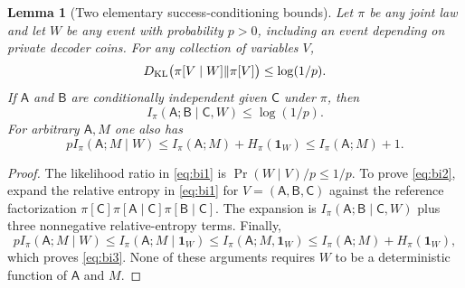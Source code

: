 \documentclass[11pt,letterpaper]{article}
\newtheorem{lemma}[theorem]{Lemma}
\numberwithin{equation}{section}
\begin{document}
\begin{lemma}[Two elementary success-conditioning bounds]
\label{lem:success-conditioning}
Let $\pi$ be any joint law and let $W$ be any event with probability $p>0$, including an event depending on private decoder coins.
For any collection of variables $V$,
\begin{equation}
D_{\rm KL}\bigl(\pi[V\mid W]\Vert\pi[V]\bigr)\le\log(1/p).
 \label{eq:bi1}
\end{equation}
If $\mathsf{A}$ and $\mathsf{B}$ are conditionally independent given $\mathsf{C}$ under $\pi$, then
\begin{equation}
I_\pi(\mathsf{A};\mathsf{B}\mid \mathsf{C},W)\le\log(1/p).
 \label{eq:bi2}
\end{equation}
For arbitrary $\mathsf{A},M$ one also has
\begin{equation}
p I_\pi(\mathsf{A};M\mid W)\le I_\pi(\mathsf{A};M)+H_\pi(\mathbf{1}_W)
 \le I_\pi(\mathsf{A};M)+1.
 \label{eq:bi3}
\end{equation}
\end{lemma}
\begin{proof}
The likelihood ratio in \eqref{eq:bi1} is $\Pr(W\mid V)/p\le1/p$.
To prove \eqref{eq:bi2}, expand the relative entropy in \eqref{eq:bi1} for $V=(\mathsf{A},\mathsf{B},\mathsf{C})$ against the reference factorization $\pi[\mathsf{C}]\pi[\mathsf{A}\mid \mathsf{C}]\pi[\mathsf{B}\mid \mathsf{C}]$.
The expansion is $I_\pi(\mathsf{A};\mathsf{B}\mid \mathsf{C},W)$ plus three nonnegative relative-entropy terms.
Finally,
\[
 pI_\pi(\mathsf{A};M\mid W)
 \le I_\pi(\mathsf{A};M\mid\mathbf{1}_W)
 \le I_\pi(\mathsf{A};M,\mathbf{1}_W)
 \le I_\pi(\mathsf{A};M)+H_\pi(\mathbf{1}_W),
\]
which proves \eqref{eq:bi3}.
None of these arguments requires $W$ to be a deterministic function of $\mathsf{A}$ and $M$.
\end{proof}
\end{document}
